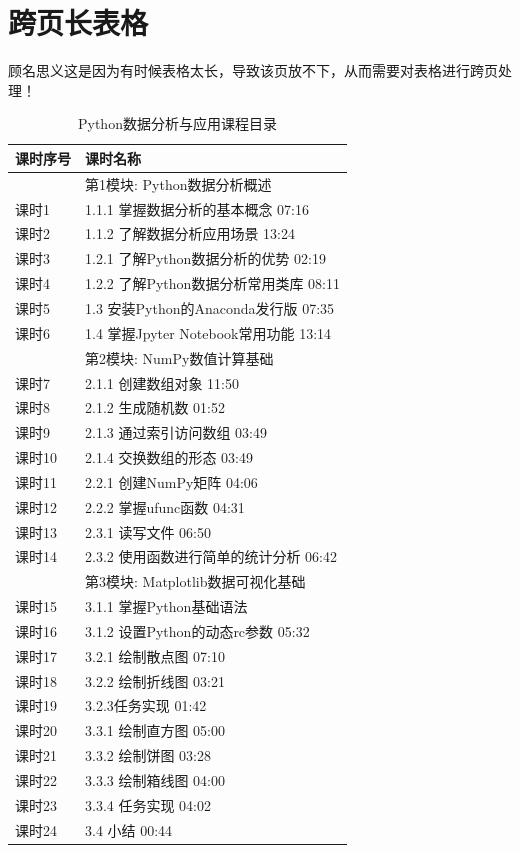 \documentclass[cn,chinese,color=cyan]{elegantbook}
\begin{document}
\section{跨页长表格}
顾名思义这是因为有时候表格太长，导致该页放不下，从而需要对表格进行跨页处理！
\begin{longtable}{|m{3cm}<{\centering}|m{11cm}|}
	\caption{Python数据分析与应用课程目录  } \\ \hline
	课时序号	&	课时名称	\\	\hline
	~	&	第1模块: Python数据分析概述 	\\	\hline
	课时1	&	1.1.1 掌握数据分析的基本概念 07:16 	\\	\hline
	课时2	&	 1.1.2 了解数据分析应用场景 13:24 	\\	\hline
	课时3	&	1.2.1 了解Python数据分析的优势 02:19 	\\	\hline
	课时4	&	1.2.2 了解Python数据分析常用类库 08:11 	\\	\hline
	课时5	&	1.3 安装Python的Anaconda发行版 07:35 	\\	\hline
	课时6	&	1.4 掌握Jpyter Notebook常用功能 13:14 	\\	\hline
	~	&	第2模块: NumPy数值计算基础 	\\	\hline
	课时7	&	 2.1.1 创建数组对象 11:50 	\\	\hline
	课时8	&	2.1.2 生成随机数 01:52 	\\	\hline
	课时9	&	2.1.3 通过索引访问数组 03:49 	\\	\hline
	课时10	&	2.1.4 交换数组的形态 03:49 	\\	\hline
	课时11	&	2.2.1 创建NumPy矩阵 04:06 	\\	\hline
	课时12	&	2.2.2 掌握ufunc函数 04:31 	\\	\hline
	课时13	&	2.3.1 读写文件 06:50 	\\	\hline
	课时14	&	2.3.2 使用函数进行简单的统计分析 06:42 	\\	\hline
	~	&	第3模块: Matplotlib数据可视化基础 	\\	\hline
	课时15	&	 3.1.1 掌握Python基础语法  	\\	\hline
	课时16	&	 3.1.2 设置Python的动态rc参数 05:32 	\\	\hline
	课时17	&	 3.2.1 绘制散点图 07:10 	\\	\hline
	课时18	&	 3.2.2 绘制折线图 03:21 	\\	\hline
	课时19	&	 3.2.3任务实现 01:42 	\\	\hline
	课时20	&	 3.3.1 绘制直方图 05:00 	\\	\hline
	课时21	&	 3.3.2 绘制饼图 03:28 	\\	\hline
	课时22	&	 3.3.3 绘制箱线图 04:00 	\\	\hline
	课时23	&	 3.3.4 任务实现 04:02 	\\	\hline
	课时24	&	 3.4 小结 00:44 	\\	\hline
\end{longtable}
\end{document}
